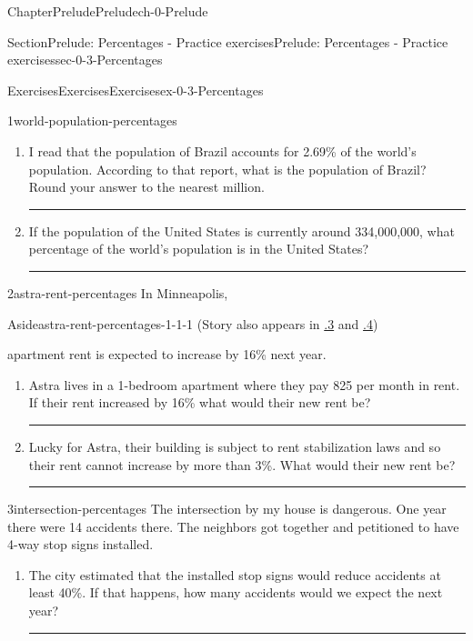 \documentclass[twoside,11pt,]{book}
\newcommand{\xreffont}{\relax}
\newlength{\workspacestrutwidth}
\numberwithin{equation}{section}
\begin{document}
\begin{chapterptx}{Chapter}{Prelude}{}{Prelude}{}{}{ch-0-Prelude}
\begin{sectionptx}{Section}{Prelude: Percentages - Practice exercises}{}{Prelude: Percentages - Practice exercises}{}{}{sec-0-3-Percentages}
\begin{exercises-subsection-numberless}{Exercises}{Exercises}{}{Exercises}{}{}{ex-0-3-Percentages}
\begin{divisionexercise}{1}{}{}{world-population-percentages}
\begin{enumerate}[label=(\alph*),ref=\alph*]%
\item{}I read that the population of Brazil accounts for 2.69\% of the world's population. According to that report, what is the population of Brazil? Round your answer to the nearest million.%
\par\rule{\workspacestrutwidth}{1in}%
\item{}If the population of the United States is currently around 334,000,000, what percentage of the world's population is in the United States?%
\par\rule{\workspacestrutwidth}{1in}%
\end{enumerate}%
\end{divisionexercise}%
 \begin{divisionexercise}{2}{}{}{astra-rent-percentages}%
In Minneapolis, \begin{aside}{Aside}{}{astra-rent-percentages-1-1-1}%
(Story also appears in \hyperlink{astra-rent-algebraic-notation}{{\xreffont 0.7.3}} and \hyperlink{astra-rent-logarithms}{{\xreffont 0.9.4}})%
\end{aside}
 apartment rent is expected to increase by 16\% next year.%
\begin{enumerate}[label=(\alph*),ref=\alph*]%
\item{}Astra lives in a 1-bedroom apartment where they pay \textdollar{}825 per month in rent. If their rent increased by 16\% what would their new rent be?%
\par\rule{\workspacestrutwidth}{1in}%
\item{}Lucky for Astra, their building is subject to rent stabilization laws and so their rent cannot increase by more than 3\%. What would their new rent be?%
\par\rule{\workspacestrutwidth}{0in}%
\end{enumerate}%
\end{divisionexercise}%
\clearpage
\begin{divisionexercise}{3}{}{}{intersection-percentages}%
The intersection by my house is dangerous. One year there were 14 accidents there. The neighbors got together and petitioned to have 4-way stop signs installed.%
\begin{enumerate}[label=(\alph*),ref=\alph*]%
\item{}The city estimated that the installed stop signs would reduce accidents at least 40\%. If that happens, how many accidents would we expect the next year?%
\par\rule{\workspacestrutwidth}{1in}%

\end{enumerate}
\end{divisionexercise}
\end{exercises-subsection-numberless}
\end{sectionptx}
\end{chapterptx}
\end{document}
